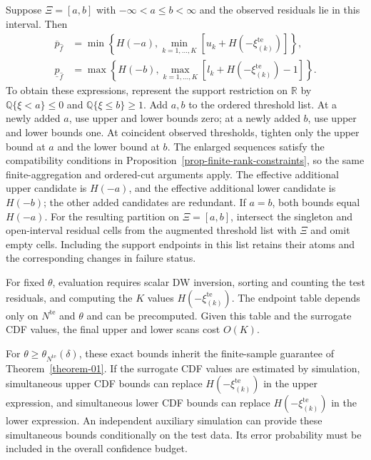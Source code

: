 \documentclass[review,11pt,3p,authoryear,nopreprintline]{elsarticle}
\begin{document}
\begin{remark}
  \label{rem-interval-support}
  Suppose $\Xi=[a,b]$ with $-\infty<a\le b<\infty$ and the observed residuals lie in this interval. Then
  \begin{align*}
    \overline p_{\hat f}
    &=\min\left\{H(-a),\min_{k=1,\ldots,K}[u_k+H\left(-\xi_{(k)}^{\mathrm{te}}\right)]\right\},\\
    \underline p_{\hat f}
    &=\max\left\{H(-b),\max_{k=1,\ldots,K}[l_k+H\left(-\xi_{(k)}^{\mathrm{te}}\right)-1]\right\}.
  \end{align*}
  To obtain these expressions, represent the support restriction on $\mathbb R$ by
  $\mathbb Q\{\xi<a\}\le0$ and $\mathbb Q\{\xi\le b\}\ge1$.
  Add $a,b$ to the ordered threshold list. At a newly added $a$, use upper and lower bounds zero; at a newly added $b$, use upper and lower bounds one. At coincident observed thresholds, tighten only the upper bound at $a$ and the lower bound at $b$. The enlarged sequences satisfy the compatibility conditions in Proposition~\ref{prop-finite-rank-constraints}, so the same finite-aggregation and ordered-cut arguments apply. The effective additional upper candidate is $H(-a)$, and the effective additional lower candidate is $H(-b)$; the other added candidates are redundant. If $a=b$, both bounds equal $H(-a)$. For the resulting partition on $\Xi=[a,b]$, intersect the singleton and open-interval residual cells from the augmented threshold list with $\Xi$ and omit empty cells. Including the support endpoints in this list retains their atoms and the corresponding changes in failure status.
\end{remark}

For fixed $\theta$, evaluation requires scalar DW inversion, sorting and counting the test residuals, and computing the $K$ values $H\left(-\xi_{(k)}^{\mathrm{te}}\right)$. The endpoint table depends only on $N^{\mathrm{te}}$ and $\theta$ and can be precomputed. Given this table and the surrogate CDF values, the final upper and lower scans cost $O(K)$.

For $\theta\ge\theta_{N^{\mathrm{te}}}(\delta)$, these exact bounds inherit the finite-sample guarantee of Theorem~\ref{theorem-01}. If the surrogate CDF values are estimated by simulation, simultaneous upper CDF bounds can replace $H\left(-\xi_{(k)}^{\mathrm{te}}\right)$ in the upper expression, and simultaneous lower CDF bounds can replace $H\left(-\xi_{(k)}^{\mathrm{te}}\right)$ in the lower expression. An independent auxiliary simulation can provide these simultaneous bounds conditionally on the test data. Its error probability must be included in the overall confidence budget.
\end{document}
